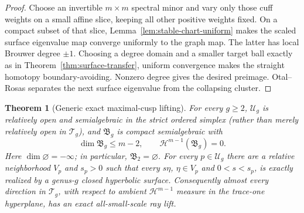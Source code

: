 \documentclass[11pt,reqno]{amsart}
\newtheorem{theorem}{Theorem}[section]
\theoremstyle{definition}
\theoremstyle{remark}
\begin{document}
\begin{proof}
Choose an invertible $m\times m$ spectral minor and vary only those cuff
weights on a small affine slice, keeping all other positive weights fixed.
On a compact subset of that slice,
Lemma~\ref{lem:stable-chart-uniform} makes the scaled surface eigenvalue map
converge uniformly to the graph map.  The latter has local Brouwer degree
$\pm1$.  Choosing a degree domain and a smaller target ball exactly as in
Theorem~\ref{thm:surface-transfer}, uniform convergence makes the straight
homotopy boundary-avoiding.  Nonzero degree gives the desired preimage.
Otal--Rosas separates the next surface eigenvalue from the collapsing
cluster.
\end{proof}

\begin{theorem}[Generic exact maximal-cusp lifting]
\label{thm:generic-exact}
For every $g\ge2$, $\mathcal U_g$ is relatively open and semialgebraic in the
strict ordered simplex (rather than merely relatively open in
$\mathcal T_g$), and $\mathfrak B_g$ is compact semialgebraic with
\begin{equation}\label{eq:skeleton-dimension}
 \dim\mathfrak B_g\le m-2,\qquad
 \mathcal H^{m-1}(\mathfrak B_g)=0.
\end{equation}
Here $\dim\varnothing=-\infty$; in particular,
$\mathfrak B_2=\varnothing$.
For every $p\in\mathcal U_g$ there are a relative neighborhood $V_p$ and
$s_p>0$ such that every $s\eta$, $\eta\in V_p$ and $0<s<s_p$, is exactly
realized by a genus-$g$ closed hyperbolic surface.  Consequently almost every
direction in $\mathcal T_g$, with respect to ambient
$\mathcal H^{m-1}$ measure in the trace-one hyperplane, has an exact
all-small-scale ray lift.
\end{theorem}
\end{document}
